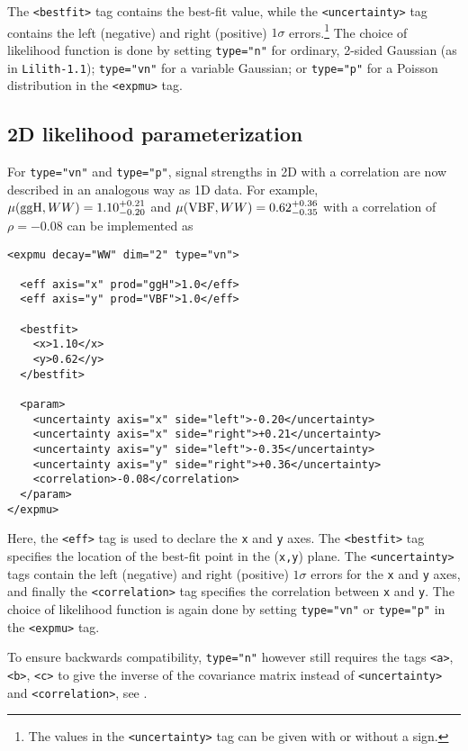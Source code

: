 \noindent
The {\tt <bestfit>} tag contains the best-fit value, while  
the {\tt <uncertainty>} tag contains the left (negative) and right (positive) $1\sigma$ errors.\footnote{The values in the {\tt <uncertainty>} tag can be given with or without a sign.} 
The choice of likelihood function is done by setting  {\tt type="n"} for ordinary, 2-sided Gaussian (as in {\tt Lilith-1.1}); 
{\tt type="vn"} for a variable Gaussian; or {\tt type="p"} for a Poisson distribution in the {\tt <expmu>} tag.  


\subsection*{2D likelihood parameterization}

For {\tt type="vn"} and {\tt type="p"}, signal strengths in 2D with a correlation are now described in an analogous way as 1D data. 
For example,  $\mu({\rm ggH}, WW)=1.10^{+0.21}_{-0.20}$ and $\mu({\rm VBF}, WW)=0.62^{+0.36}_{-0.35}$ with a correlation 
of $\rho=-0.08$ can be implemented as 

\begin{verbatim}
<expmu decay="WW" dim="2" type="vn">
 
  <eff axis="x" prod="ggH">1.0</eff>
  <eff axis="y" prod="VBF">1.0</eff>

  <bestfit>
    <x>1.10</x>
    <y>0.62</y>
  </bestfit>
 
  <param>
    <uncertainty axis="x" side="left">-0.20</uncertainty>
    <uncertainty axis="x" side="right">+0.21</uncertainty>
    <uncertainty axis="y" side="left">-0.35</uncertainty>
    <uncertainty axis="y" side="right">+0.36</uncertainty>
    <correlation>-0.08</correlation>
  </param>
</expmu>
\end{verbatim}

\noindent
Here, the {\tt <eff>} tag is used to declare the {\tt x} and {\tt y} axes. 
The {\tt <bestfit>} tag specifies the location of the best-fit point in the ({\tt x,y}) plane. 
The {\tt <uncertainty>} tags contain the left (negative) and right (positive) $1\sigma$ errors for the {\tt x} and {\tt y} axes, and finally 
the {\tt <correlation>} tag specifies the correlation between {\tt x} and {\tt y}. 
The choice of likelihood function is again done by setting {\tt type="vn"} or {\tt type="p"}  in the {\tt <expmu>} tag. 

To ensure backwards compatibility, {\tt type="n"} however still requires the tags {\tt <a>}, {\tt <b>}, {\tt <c>} to give the inverse of
the covariance matrix %
instead of {\tt <uncertainty>} and  {\tt <correlation>}, see \cite{Bernon:2015hsa}.


